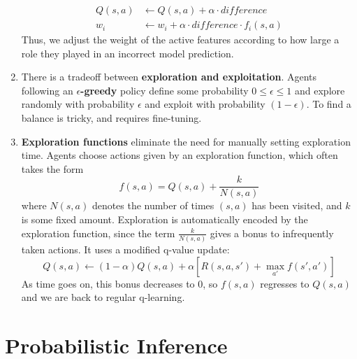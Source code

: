 \documentclass[10pt]{article}
\begin{document}
\begin{multicols}{2}
\begin{addmargin}[0.8em]{0.5em}
\begin{enumerate}[label=(\alph*)]
        \begin{align*}
            Q(s,a) &\leftarrow Q(s,a) + \alpha \cdot \textit{difference} \\
            w_i &\leftarrow w_i + \alpha \cdot \textit{difference} \cdot f_i(s,a)
        \end{align*}
        Thus, we adjust the weight of the active features according to how large a role they played in an incorrect model prediction.
        \item There is a tradeoff between \textbf{exploration and exploitation}. Agents following an \textbf{$\epsilon$-greedy} policy define some probability $0 \leq \epsilon \leq 1$ and explore randomly with probability $\epsilon$ and exploit with probability $(1-\epsilon)$. To find a balance is tricky, and requires fine-tuning.
        \item \textbf{Exploration functions} eliminate the need for manually setting exploration time. Agents choose actions given by an exploration function, which often takes the form $$f(s,a)=Q(s,a)+\frac{k}{N(s,a)}$$ where $N(s,a)$ denotes the number of times $(s,a)$ has been visited, and $k$ is some fixed amount. Exploration is automatically encoded by the exploration function, since the term $\frac{k}{N(s,a)}$ gives a bonus to infrequently taken actions. It uses a modified q-value update:
        $$Q(s,a) \leftarrow (1-\alpha)Q(s,a)+\alpha[R(s,a,s')+\max_{a'}f(s',a')]$$
        As time goes on, this bonus decreases to 0, so $f(s,a)$ regresses to $Q(s,a)$ and we are back to regular q-learning.
        \end{enumerate}    
\end{addmargin}

\section{Probabilistic Inference}
\begin{addmargin}[0.8em]{0.5em}

\end{addmargin}
\end{multicols}
\end{document}
